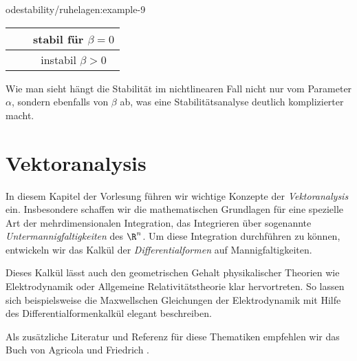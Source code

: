\documentclass[letterpaper,10pt,german]{jupyterBook}
\begin{document}
\begin{example}{}{odestability/ruhelagen:example-9}
\begin{center}
\begin{tabularx}{\linewidth}[{\linewidth}]{|c|c|c|}
&
\par

&
\par
stabil für \(\beta =0 \)
\\
\hline
\par

&
\par

&
\par
instabil \(\beta > 0\)
\\
\hline
\end{tabularx}
\end{center}

\par
Wie man sieht hängt die Stabilität im nichtlinearen Fall nicht nur vom Parameter \(\alpha\), sondern ebenfalls von \(\beta\) ab, was eine Stabilitätsanalyse deutlich komplizierter macht.
\end{example}


\chapter{Vektoranalysis}
\label{\detokenize{vektoranalysis/vektoranalysis:vektoranalysis}}\label{\detokenize{vektoranalysis/vektoranalysis::doc}}
\par
In diesem Kapitel der Vorlesung führen wir wichtige Konzepte der \emph{Vektoranalysis} ein.
Insbesondere schaffen wir die mathematischen Grundlagen für eine spezielle Art der mehrdimensionalen Integration, das Integrieren über sogenannte \emph{Untermannigfaltigkeiten} des \(\R^n\).
Um diese Integration durchführen zu können, entwickeln wir das Kalkül der \emph{Differentialformen} auf Mannigfaltigkeiten.

\par
Dieses Kalkül lässt auch den geometrischen Gehalt physikalischer Theorien wie Elektrodynamik oder Allgemeine Relativitätstheorie klar hervortreten.
So lassen sich beispielsweise die Maxwellschen Gleichungen der Elektrodynamik mit Hilfe des Differentialformenkalkül elegant beschreiben.

\par
Als zusätzliche Literatur und Referenz für diese Thematiken empfehlen wir das Buch von Agricola und Friedrich \cite{AF13}.
\end{document}
